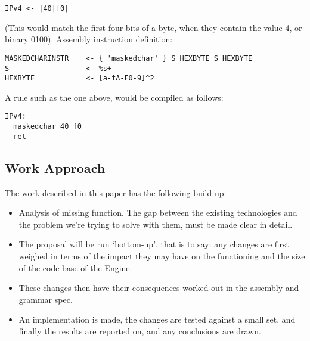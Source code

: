 \begin{changemargin}{-60mm}{0mm}
\begin{myquote}
\begin{verbatim}
IPv4 <- |40|f0|
\end{verbatim}
\end{myquote}
\end{changemargin}

(This would match the first four bits of a byte, when they contain the 
value 4, or binary 0100).
Assembly instruction definition:

\begin{changemargin}{-60mm}{0mm}
\begin{myquote}
\begin{verbatim}
MASKEDCHARINSTR    <- { 'maskedchar' } S HEXBYTE S HEXBYTE
S                  <- %s+
HEXBYTE            <- [a-fA-F0-9]^2
\end{verbatim}
\end{myquote}
\end{changemargin}

A rule such as the one above, would be compiled as follows:

\begin{changemargin}{-60mm}{0mm}
\begin{myquote}
\begin{verbatim}
IPv4:
  maskedchar 40 f0
  ret
\end{verbatim}
\end{myquote}
\end{changemargin}

\subsection{Work Approach}
The work described in this paper has the following build-up:

\begin{itemize}
    \item Analysis of missing function. The gap between the existing 
technologies and the problem we’re trying to solve with them, must be 
made clear in detail.
    \item The proposal will be run ‘bottom-up’, that is to say: any 
changes are first weighed in terms of the impact they may have on the 
functioning and the size of the code base of the Engine.
    \item These changes then have their consequences worked out in the 
assembly and grammar spec.
    \item An implementation is made, the changes are tested against a small 
set, and finally the results are reported on, and any conclusions are 
drawn.
\end{itemize}

